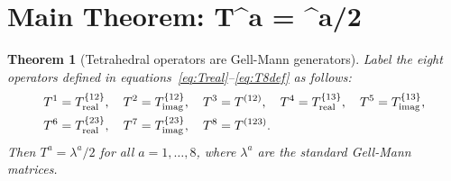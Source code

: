 \documentclass[11pt,a4paper]{article}
\newtheorem{theorem}{Theorem}[section]
\begin{document}
\section{Main Theorem: T^a = \lambda^a/2}

\begin{theorem}[Tetrahedral operators are Gell-Mann generators]
\label{thm:Tequal}
Label the eight operators defined in equations~\eqref{eq:Treal}--\eqref{eq:T8def}
as follows:
\begin{align*}
T^1 &= T^{\{12\}}_{\rm real},\quad
T^2 = T^{\{12\}}_{\rm imag},\quad
T^3 = T^{(12)},\quad
T^4 = T^{\{13\}}_{\rm real},\quad
T^5 = T^{\{13\}}_{\rm imag}, \\
T^6 &= T^{\{23\}}_{\rm real},\quad
T^7 = T^{\{23\}}_{\rm imag},\quad
T^8 = T^{(123)}.
\end{align*}
Then $T^a = \lambda^a/2$ for all $a = 1,\ldots,8$, where
$\lambda^a$ are the standard Gell-Mann matrices.
\end{theorem}
\end{document}
